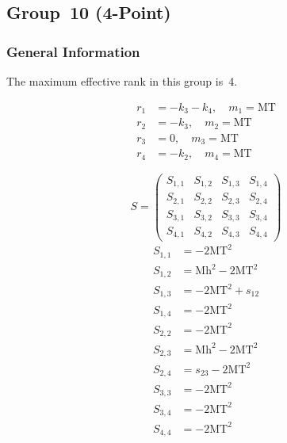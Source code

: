 \documentclass[a4paper]{article}
\begin{document}

\subsection{Group~10 (4-Point)}
\subsubsection*{General Information}
The maximum effective rank in this group is~4.

\begin{subequations}
\begin{align}
r_{1} &= -k_{3}-k_{4},\quad m_{1} = \text{MT}\\
r_{2} &= -k_{3},\quad m_{2} = \text{MT}\\
r_{3} &= 0,\quad m_{3} = \text{MT}\\
r_{4} &= -k_{2},\quad m_{4} = \text{MT}
\end{align}
\end{subequations}

\begin{equation}
S=\left(\begin{array}{cccc}
   S_{1,1}&
   S_{1,2}&
   S_{1,3}&
   S_{1,4}\\
   S_{2,1}&
   S_{2,2}&
   S_{2,3}&
   S_{2,4}\\
   S_{3,1}&
   S_{3,2}&
   S_{3,3}&
   S_{3,4}\\
   S_{4,1}&
   S_{4,2}&
   S_{4,3}&
   S_{4,4}\end{array}\right)
\end{equation}
\begin{subequations}
\begin{align}
   S_{1,1}&=-2\text{MT}^2\\
   S_{1,2}&=\text{Mh}^2-2\text{MT}^2\\
   S_{1,3}&=-2\text{MT}^2+s_{12}\\
   S_{1,4}&=-2\text{MT}^2\\
   S_{2,2}&=-2\text{MT}^2\\
   S_{2,3}&=\text{Mh}^2-2\text{MT}^2\\
   S_{2,4}&=s_{23}-2\text{MT}^2\\
   S_{3,3}&=-2\text{MT}^2\\
   S_{3,4}&=-2\text{MT}^2\\
   S_{4,4}&=-2\text{MT}^2
\end{align}
\end{subequations}
\end{document}
